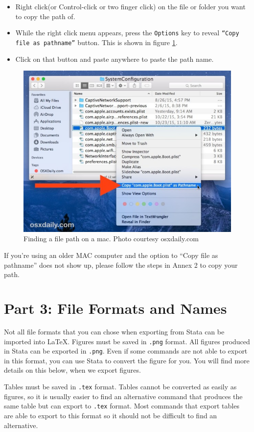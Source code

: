 \documentclass[]{article}
\begin{document}
\begin{itemize}
	\item Right click(or Control-click or two finger click) on the file or folder you want to copy the path of.
	\item While the right click menu appears, press the \texttt{Options} key to reveal \texttt{``Copy file as pathname''} button. This is shown in figure \ref{fig:filepathmac}.
	\item Click on that button and paste anywhere to paste the path name.
\end{itemize}
\begin{figure}
	\centering
	\includegraphics[width=0.7\linewidth]{../img/filepathmac}
	\caption{Finding a file path on a mac. Photo courtesy osxdaily.com}
	\label{fig:filepathmac}
\end{figure}

If you're using an older MAC computer and the option to ``Copy file as pathname'' does not show up, please follow  the steps in Annex 2 to copy your path. 

\section*{Part 3: File Formats and Names}
Not all file formats that you can chose when exporting from Stata can be imported into {\LaTeX}. Figures must be saved in \texttt{.png} format. All figures produced in Stata can be exported in \texttt{.png}. Even if some commands are not able to export in this format, you can use Stata to convert the figure for you. You will find more details on this below, when we export figures. 

Tables must be saved in \texttt{.tex} format. Tables cannot be converted as easily as figures, so it is usually easier to find an alternative command that produces the same table but can export to \texttt{.tex} format. Most commands that export tables are able to export to this format so it should not be difficult to find an alternative.
\end{document}
